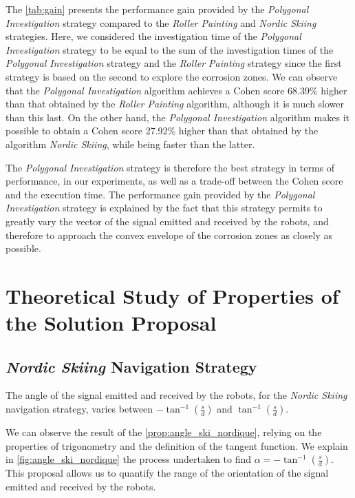 The \ref{tab:gain} presents the performance gain provided by the \textit{Polygonal Investigation} strategy compared to the \textit{Roller Painting} and \textit{Nordic Skiing} strategies.
Here, we considered the investigation time of the \textit{Polygonal Investigation} strategy to be equal to the sum of the investigation times of the \textit{Polygonal Investigation} strategy and the \textit{Roller Painting} strategy since the first strategy is based on the second to explore the corrosion zones.
We can observe that the \textit{Polygonal Investigation} algorithm achieves a Cohen score 68.39\% higher than that obtained by the \textit{Roller Painting} algorithm, although it is much slower than this last.
On the other hand, the \textit{Polygonal Investigation} algorithm makes it possible to obtain a Cohen score 27.92\% higher than that obtained by the algorithm \textit{Nordic Skiing}, while being faster than the latter.

The \textit{Polygonal Investigation} strategy is therefore the best strategy in terms of performance, in our experiments, as well as a trade-off between the Cohen score and the execution time.
The performance gain provided by the \textit{Polygonal Investigation} strategy  is explained by the fact that this strategy permits to greatly vary the vector of the signal emitted and received by the robots, and therefore to approach the convex envelope of the corrosion zones as closely as possible.


\section{Theoretical Study of Properties of the Solution Proposal}

\subsection*{\textit{Nordic Skiing} Navigation Strategy}

\begin{proposition}
	The angle of the signal emitted and received by the robots, for the \textit{Nordic Skiing} navigation strategy, varies between $-\tan^{-1}(\frac{s}{d})$ and $\tan ^{-1}(\frac{s}{d})$.
	\label{prop:angle_ski_nordique}
\end{proposition}

We can observe the result of the \ref{prop:angle_ski_nordique}, relying on the properties of trigonometry and the definition of the tangent function.
We explain in \ref{fig:angle_ski_nordique} the process undertaken to find $\alpha = -\tan^{-1}(\frac{s}{d})$.
This proposal allows us to quantify the range of the orientation of the signal emitted and received by the robots.

